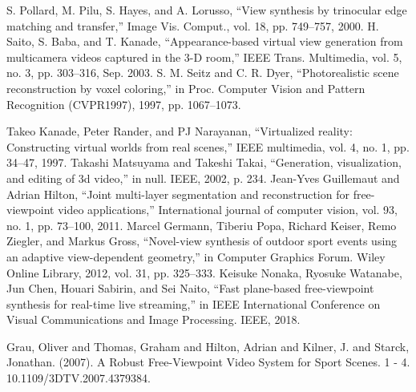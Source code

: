 \begin{thebibliography}{00}
     S. Pollard, M. Pilu, S. Hayes, and A. Lorusso, “View synthesis by
    trinocular edge matching and transfer,” Image Vis. Comput., vol. 18,
    pp. 749–757, 2000.
     H. Saito, S. Baba, and T. Kanade, “Appearance-based virtual view
    generation from multicamera videos captured in the 3-D room,” IEEE
    Trans. Multimedia, vol. 5, no. 3, pp. 303–316, Sep. 2003.
     S. M. Seitz and C. R. Dyer, “Photorealistic scene reconstruction by
    voxel coloring,” in Proc. Computer Vision and Pattern Recognition
    (CVPR1997), 1997, pp. 1067–1073.
    
     Takeo Kanade, Peter Rander, and PJ Narayanan, “Virtualized reality:
    Constructing virtual worlds from real scenes,” IEEE multimedia, vol.
    4, no. 1, pp. 34–47, 1997.
     Takashi Matsuyama and Takeshi Takai, “Generation, visualization,
    and editing of 3d video,” in null. IEEE, 2002, p. 234.
     Jean-Yves Guillemaut and Adrian Hilton, “Joint multi-layer segmentation 
    and reconstruction for free-viewpoint video applications,”
    International journal of computer vision, vol. 93, no. 1, pp. 73–100,
    2011.
     Marcel Germann, Tiberiu Popa, Richard Keiser, Remo Ziegler, and
    Markus Gross, “Novel-view synthesis of outdoor sport events using
    an adaptive view-dependent geometry,” in Computer Graphics Forum.
    Wiley Online Library, 2012, vol. 31, pp. 325–333.
     Keisuke Nonaka, Ryosuke Watanabe, Jun Chen, Houari Sabirin, and
    Sei Naito, “Fast plane-based free-viewpoint synthesis for real-time
    live streaming,” in IEEE International Conference on Visual Communications 
    and Image Processing. IEEE, 2018.


     Grau, Oliver and Thomas, Graham and Hilton, Adrian and Kilner, J. and Starck, Jonathan. (2007). 
    A Robust Free-Viewpoint Video System for Sport Scenes. 1 - 4. 10.1109/3DTV.2007.4379384.
\end{thebibliography}

